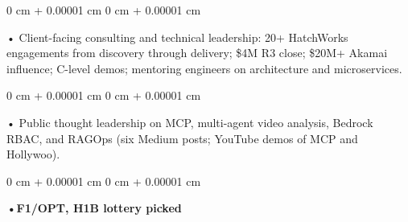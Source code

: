 \documentclass[10pt, letterpaper]{article}
\newenvironment{onecolentry}{
    \begin{adjustwidth}{
        0 cm + 0.00001 cm
    }{
        0 cm + 0.00001 cm
    }
}{
    \end{adjustwidth}
} %
\begin{document}
        \begin{onecolentry}
            • Client-facing consulting and technical leadership: 20+ HatchWorks engagements from discovery through delivery; \$4M R3 close; \$20M+ Akamai influence; C-level demos; mentoring engineers on architecture and microservices.
        \end{onecolentry}
        \begin{onecolentry}
            • Public thought leadership on MCP, multi-agent video analysis, Bedrock RBAC, and RAGOps (six Medium posts; YouTube demos of MCP and Hollywoo).
        \end{onecolentry}
        \begin{onecolentry}
                \textbf{•F1/OPT, H1B lottery picked}
        \end{onecolentry}

    \vspace{2 pt }
\end{document}
